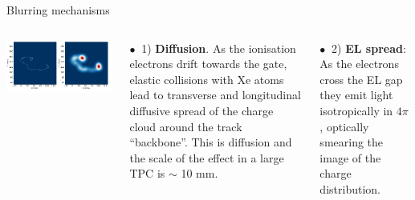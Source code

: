\documentclass [aspectratio=169]{beamer}
\begin{document}
\begin{frame}{Blurring mechanisms}

\begin{columns}
\includegraphics[scale=0.27]{diffusion.png}


$\bullet~$ 1) {\bf Diffusion}. As the ionisation electrons drift towards the gate, elastic collisions with Xe atoms lead to transverse and longitudinal diffusive spread of the charge cloud around the track ``backbone''. This is diffusion and the scale of the effect in a large TPC is $\sim$ 10 mm.

$\bullet~$ 2) {\bf EL spread}: As the electrons cross the EL gap they emit light isotropically in $4\pi$, optically smearing the image of the charge distribution. 

 \end{columns}
\end{frame}

 


\end{document}
